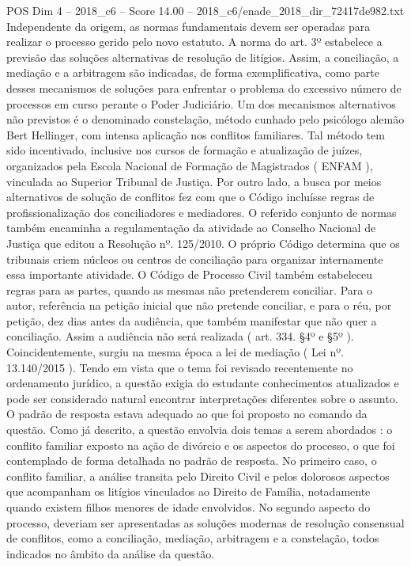 \begin{textsample}{POS Dim 4 – 2018\_c6 – Score 14.00 – 2018\_c6/enade\_2018\_dir\_72417de982.txt}
Independente da origem, as normas fundamentais devem ser operadas para realizar o processo gerido pelo novo estatuto.
A norma do art. 3º estabelece a previsão das soluções alternativas de resolução de litígios.
Assim, a conciliação, a mediação e a arbitragem são indicadas, de forma exemplificativa, como parte desses mecanismos de soluções para enfrentar o problema do excessivo número de processos em curso perante o Poder Judiciário.
Um dos mecanismos alternativos não previstos é o denominado constelação, método cunhado pelo psicólogo alemão Bert Hellinger, com intensa aplicação nos conflitos familiares.
Tal método tem sido incentivado, inclusive nos cursos de formação e atualização de juízes, organizados pela Escola Nacional de Formação de Magistrados ( ENFAM ), vinculada ao Superior Tribunal de Justiça.
Por outro lado, a busca por meios alternativos de solução de conflitos fez com que o Código incluísse regras de profissionalização dos conciliadores e mediadores.
O referido conjunto de normas também encaminha a regulamentação da atividade ao Conselho Nacional de Justiça que editou a Resolução nº. 125/2010.
O próprio Código determina que os tribunais criem núcleos ou centros de conciliação para organizar internamente essa importante atividade.
O Código de Processo Civil também estabeleceu regras para as partes, quando as mesmas não pretenderem conciliar.
Para o autor, referência na petição inicial que não pretende conciliar, e para o réu, por petição, dez dias antes da audiência, que também manifestar que não quer a conciliação.
Assim a audiência não será realizada ( art. 334. §4º e §5º ).
Coincidentemente, surgiu na mesma época a lei de mediação ( Lei nº. 13.140/2015 ).
Tendo em vista que o tema foi revisado recentemente no ordenamento jurídico, a questão exigia do estudante conhecimentos atualizados e pode ser considerado natural encontrar interpretações diferentes sobre o assunto.
O padrão de resposta estava adequado ao que foi proposto no comando da questão.
Como já descrito, a questão envolvia dois temas a serem abordados : o conflito familiar exposto na ação de divórcio e os aspectos do processo, o que foi contemplado de forma detalhada no padrão de resposta.
No primeiro caso, o conflito familiar, a análise transita pelo Direito Civil e pelos dolorosos aspectos que acompanham os litígios vinculados ao Direito de Família, notadamente quando existem filhos menores de idade envolvidos.
No segundo aspecto do processo, deveriam ser apresentadas as soluções modernas de resolução consensual de conflitos, como a conciliação, mediação, arbitragem e a constelação, todos indicados no âmbito da análise da questão.

\end{textsample}
